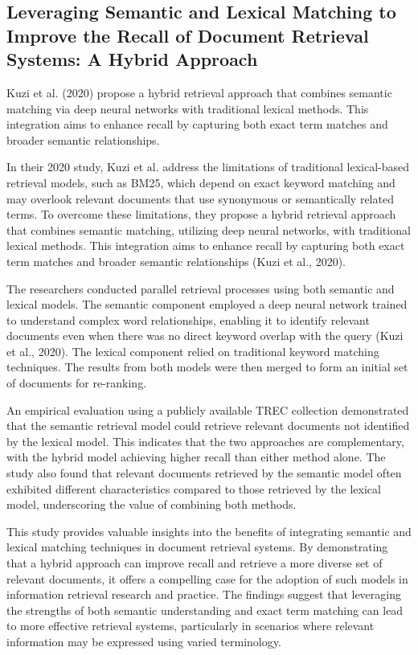 \subsection{Leveraging Semantic and Lexical Matching to Improve the Recall of Document Retrieval Systems: A Hybrid Approach}

\noindent Kuzi et al. (2020) propose a hybrid retrieval approach that combines semantic matching via deep neural networks with traditional lexical methods. This integration aims to enhance recall by capturing both exact term matches and broader semantic relationships.

In their 2020 study, Kuzi et al. address the limitations of traditional lexical-based retrieval models, such as BM25, which depend on exact keyword matching and may overlook relevant documents that use synonymous or semantically related terms. To overcome these limitations, they propose a hybrid retrieval approach that combines semantic matching, utilizing deep neural networks, with traditional lexical methods. This integration aims to enhance recall by capturing both exact term matches and broader semantic relationships (Kuzi et al., 2020).

The researchers conducted parallel retrieval processes using both semantic and lexical models.  The semantic component employed a deep neural network trained to understand complex word relationships, enabling it to identify relevant documents even when there was no direct keyword overlap with the query (Kuzi et al., 2020). The lexical component relied on traditional keyword matching techniques. The results from both models were then merged to form an initial set of documents for re-ranking.

An empirical evaluation using a publicly available TREC collection demonstrated that the semantic retrieval model could retrieve relevant documents not identified by the lexical model. This indicates that the two approaches are complementary, with the hybrid model achieving higher recall than either method alone. The study also found that relevant documents retrieved by the semantic model often exhibited different characteristics compared to those retrieved by the lexical model, underscoring the value of combining both methods.

This study provides valuable insights into the benefits of integrating semantic and lexical matching techniques in document retrieval systems. By demonstrating that a hybrid approach can improve recall and retrieve a more diverse set of relevant documents, it offers a compelling case for the adoption of such models in information retrieval research and practice. The findings suggest that leveraging the strengths of both semantic understanding and exact term matching can lead to more effective retrieval systems, particularly in scenarios where relevant information may be expressed using varied terminology.


